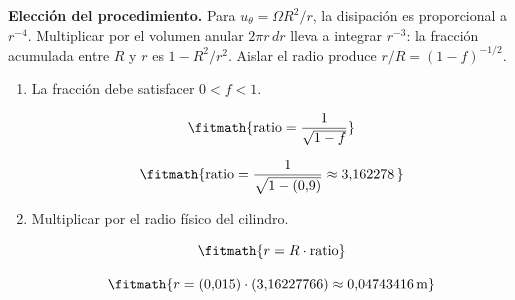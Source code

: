 \noindent\textbf{Elección del procedimiento.} Para $u_\theta=\Omega R^2/r$, la disipación es proporcional a $r^{-4}$. Multiplicar por el volumen anular $2\pi r\,dr$ lleva a integrar $r^{-3}$: la fracción acumulada entre $R$ y $r$ es $1-R^2/r^2$. Aislar el radio produce $r/R=(1-f)^{-1/2}$.

\begin{enumerate}

\item La fracción debe satisfacer $0<f<1$.

\[\fitmath{\mathrm{ratio}=\frac{1}{\sqrt{1-f}}}\]

\[\fitmath{\mathrm{ratio}=\frac{1}{\sqrt{1-(0{,}9)}}\approx 3{,}162278\,}\]

\item Multiplicar por el radio físico del cilindro.

\[\fitmath{r=R\cdot \mathrm{ratio}}\]

\[\fitmath{r=(0{,}015)\cdot (3{,}16227766)\approx 0{,}04743416\,\mathrm{m}}\]

\end{enumerate}
